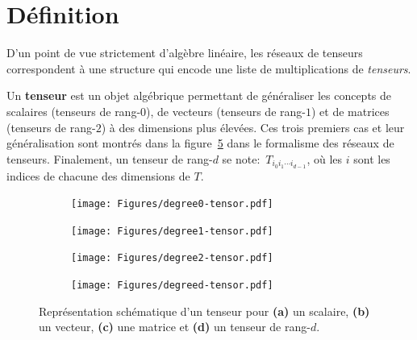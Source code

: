 \section{Définition}\label{sec:tn-definition}
D'un point de vue strictement d'algèbre linéaire, les réseaux de tenseurs correspondent à une structure qui encode une liste de multiplications de \emph{tenseurs}.
\begin{definition}\label{def:tensor}
    Un \textbf{tenseur} est un objet algébrique permettant de généraliser les concepts de scalaires (tenseurs de rang-$0$), de vecteurs (tenseurs de rang-$1$) et de matrices (tenseurs de rang-$2$) à des dimensions plus élevées.
    Ces trois premiers cas et leur généralisation sont montrés dans la figure~\ref{fig:tensor-schematic-def} dans le formalisme des réseaux de tenseurs.
    Finalement, un tenseur de rang-$d$ se note:~$T_{i_0 i_1 \cdots i_{d-1}}$, où les $i$ sont les indices de chacune des dimensions de $T$.
    \begin{figure}[h]
        \centering
        \begin{subfigure}{.245\textwidth}
            \centering
            \texttt{[image: Figures/degree0-tensor.pdf]}
            \caption{}
            \label{fig:tensor-scalar}
        \end{subfigure}
        \begin{subfigure}{.245\textwidth}%
            \centering
            \texttt{[image: Figures/degree1-tensor.pdf]}
            \caption{}
            \label{fig:tensor-vector}
        \end{subfigure}
        \begin{subfigure}{.245\textwidth}%
            \centering
            \texttt{[image: Figures/degree2-tensor.pdf]}
            \caption{}
            \label{fig:tensor-matrix}
        \end{subfigure}
        \begin{subfigure}{.245\textwidth}%
            \centering
            \texttt{[image: Figures/degreed-tensor.pdf]}
            \caption{}
            \label{fig:tensor-tensor}
        \end{subfigure}
        \caption{Représentation schématique d'un tenseur pour \textbf{(a)} un scalaire, \textbf{(b)} un vecteur, \textbf{(c)} une matrice et \textbf{(d)} un tenseur de rang-$d$.}
        \label{fig:tensor-schematic-def}
    \end{figure}
\end{definition}

